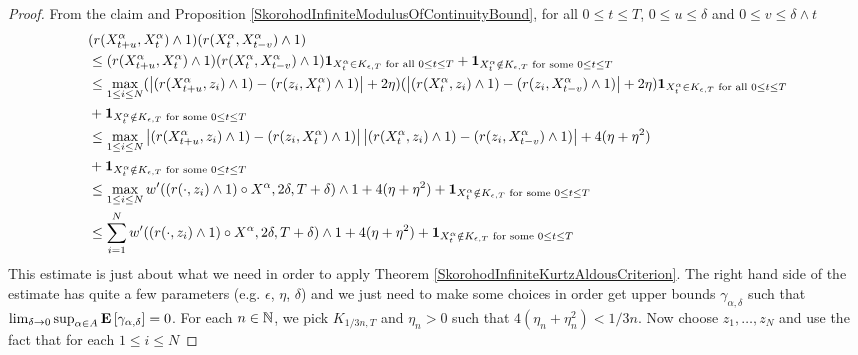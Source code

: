 \begin{proof}
From the claim and Proposition \ref{SkorohodInfiniteModulusOfContinuityBound}, for all $0 \leq t \leq T$, $0 \leq u \leq \delta$ and $0 \leq v \leq \delta \wedge t$
\begin{align*}
&(r(X^\alpha_{t + u}, X^\alpha_t) \wedge 1) (r(X^\alpha_{t}, X^\alpha_{t-v}) \wedge 1) \\
&\leq (r(X^\alpha_{t + u}, X^\alpha_t) \wedge 1) (r(X^\alpha_{t}, X^\alpha_{t-v}) \wedge 1) \textbf{1}_{X^\alpha_t \in K_{\epsilon, T}\text{ for all } 0 \leq t \leq T} + \textbf{1}_{X^\alpha_t \notin K_{\epsilon, T} \text{ for some } 0 \leq t \leq T} \\
&\leq \max_{1 \leq i \leq N} (\left \vert (r(X^\alpha_{t+u},z_i) \wedge 1) - (r(z_i,X^\alpha_{t}) \wedge 1) \right \vert + 2 \eta) (\left \vert (r(X^\alpha_{t},z_i) \wedge 1) - (r(z_i,X^\alpha_{t-v}) \wedge 1) \right \vert + 2 \eta) \textbf{1}_{X^\alpha_t \in K_{\epsilon, T} \text{ for all } 0 \leq t \leq T} \\
&+ \textbf{1}_{X^\alpha_t \notin K_{\epsilon, T} \text{ for some } 0 \leq t \leq T} \\
&\leq \max_{1 \leq i \leq N} \left \vert (r(X^\alpha_{t+u},z_i) \wedge 1) - (r(z_i,X^\alpha_{t}) \wedge 1) \right \vert \left \vert (r(X^\alpha_{t},z_i) \wedge 1) - (r(z_i,X^\alpha_{t-v}) \wedge 1) \right \vert + 4( \eta + \eta^2) \\
&+ \textbf{1}_{X^\alpha_t \notin K_{\epsilon, T} \text{ for some } 0 \leq t \leq T} \\
&\leq \max_{1 \leq i \leq N} w^\prime((r(\cdot , z_i) \wedge 1) \circ X^\alpha, 2\delta, T+ \delta) \wedge 1 + 4( \eta + \eta^2) + \textbf{1}_{X^\alpha_t \notin K_{\epsilon, T} \text{ for some } 0 \leq t \leq T} \\
&\leq \sum_{i=1}^N w^\prime((r(\cdot , z_i) \wedge 1) \circ X^\alpha, 2\delta, T+ \delta) \wedge 1 + 4( \eta + \eta^2) + \textbf{1}_{X^\alpha_t \notin K_{\epsilon, T} \text{ for some } 0 \leq t \leq T} \\
\end{align*}
This estimate is just about what we need in order to apply Theorem \ref{SkorohodInfiniteKurtzAldousCriterion}.  The right hand side of the estimate has quite a few parameters (e.g. $\epsilon$, $\eta$, $\delta$) and we just need to make some choices in order get upper bounds $\gamma_{\alpha, \delta}$ such that $\lim_{\delta \to 0} \sup_{\alpha \in A} \textbf{E}\left[\gamma_{\alpha, \delta}\right] = 0$.  For each
$n \in \mathbb{N}$, we pick $K_{1/3n, T}$ and $\eta_n>0$ such that $4(\eta_n + \eta_n^2) < 1/3n$.  Now choose $z_1, \dotsc, z_N$ and use the fact that  for each $1 \leq i \leq N$

\end{proof}
